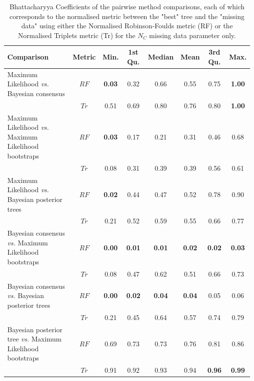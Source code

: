 \documentclass[12pt,letterpaper]{article}
\begin{document}
\begin{landscape}
\begin{table}[ht]
\caption{Bhattacharyya Coefficients of the pairwise method comparisons, each of which corresponds to the normalised metric between the "best" tree and the "missing data" using either the Normalised Robinson-Foulds metric (RF) or the Normalised Triplets metric (Tr) for the $N_{C}$ missing data parameter only.}
\label{Tab_Supp_summary_BC_MC}
\centering
\begin{tabular}{lccccccc}
  \hline
 Comparison &  Metric & Min. & 1st Qu. & Median & Mean & 3rd Qu. & Max. \\  
  \hline
    Maximum Likelihood \textit{vs.} Bayesian consensus                 & $RF$ & \textbf{0.03} & 0.32 & 0.66 & 0.55 & 0.75 & \textbf{1.00} \\ 
                                                                       & $Tr$ & 0.51 & 0.69 & 0.80 & 0.76 & 0.80 & \textbf{1.00} \\ 
    Maximum Likelihood \textit{vs.} Maximum Likelihood bootstraps      & $RF$ & \textbf{0.03} & 0.17 & 0.21 & 0.31 & 0.46 & 0.68 \\ 
                                                                       & $Tr$ & 0.08 & 0.31 & 0.39 & 0.39 & 0.56 & 0.61 \\ 
    Maximum Likelihood \textit{vs.} Bayesian posterior trees           & $RF$ & \textbf{0.02} & 0.44 & 0.47 & 0.52 & 0.78 & 0.90 \\ 
                                                                       & $Tr$ & 0.21 & 0.52 & 0.59 & 0.55 & 0.66 & 0.77 \\ 
    Bayesian consensus \textit{vs.} Maximum Likelihood bootstraps      & $RF$ & \textbf{0.00} & \textbf{0.01} & \textbf{0.01} & \textbf{0.02} & \textbf{0.02} & \textbf{0.03} \\ 
                                                                       & $Tr$ & 0.08 & 0.47 & 0.62 & 0.51 & 0.66 & 0.73 \\ 
    Bayesian consensus \textit{vs.} Bayesian posterior trees           & $RF$ & \textbf{0.00} & \textbf{0.02} & \textbf{0.04} & \textbf{0.04} & 0.05 & 0.06 \\ 
                                                                       & $Tr$ & 0.21 & 0.45 & 0.64 & 0.57 & 0.74 & 0.79 \\ 
    Bayesian posterior tree \textit{vs.} Maximum Likelihood bootstraps & $RF$ & 0.69 & 0.73 & 0.73 & 0.76 & 0.81 & 0.86 \\ 
                                                                       & $Tr$ & 0.91 & 0.92 & 0.93 & 0.94 & \textbf{0.96} & \textbf{0.99} \\ 
   \hline
\end{tabular}
\end{table}
\end{landscape}
\end{document}
